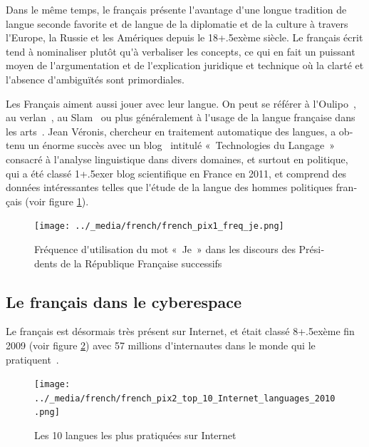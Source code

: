 \begin{french}
\begin{multicols}{2}
Dans le même temps, le français présente l{\mbox '}avantage d{\mbox '}une
longue tradition de langue seconde favorite et de langue de la
diplomatie et de la culture à travers l{\mbox '}Europe, la Russie et
les Amériques depuis le 18\raise+.5ex\hbox{ème} siècle. Le français
écrit tend à nominaliser plutôt qu{\mbox '}à verbaliser les concepts,
ce qui en fait un puissant moyen de l{\mbox '}argumentation et de
l{\mbox '}explication juridique et technique où la clarté et l{\mbox
 '}absence d{\mbox '}ambiguïtés sont primordiales.

Les Français aiment aussi jouer avec leur langue. On peut se référer à
l{\mbox '}Oulipo~\cite{oulipo}, au verlan~\cite{plenat95}, au
Slam~\cite{slam} ou plus généralement à l{\mbox '}usage de la langue
française dans les arts~\cite{arts}. Jean Véronis, chercheur en
traitement automatique des langues, a obtenu un énorme succès avec un
blog~\cite{veronis} intitulé «~Technologies du Langage~» consacré à
l{\mbox '}analyse linguistique dans divers domaines, et surtout en
politique, qui a été classé 1\raise+.5ex\hbox{er} blog scientifique en
France en 2011, et comprend des données intéressantes telles que
l{\mbox '}étude de la langue des hommes politiques français (voir
figure \ref{fig:je_stats}).

\begin{figure}[!ht]
\begin{center}
 \texttt{[image: ../\_media/french/french\_pix1\_freq\_je.png]} 
  \caption{Fréquence d{\mbox '}utilisation du mot «~Je~» dans les discours des Présidents de la République Française successifs}
  \label{fig:je_stats}
\end{center}
\end{figure}

\subsection{Le français dans le cyberespace}

Le français est désormais très présent sur Internet, et était classé
8\raise+.5ex\hbox{ème} fin 2009 (voir figure \ref{fig:internettop10})
avec 57 millions d{\mbox '}internautes dans le monde qui le pratiquent~\cite{internettop10}.

\begin{figure}[!ht]
\begin{center}
 \texttt{[image: ../\_media/french/french\_pix2\_top\_10\_Internet\_languages\_2010.png]}
  \caption{Les 10 langues les plus pratiquées sur Internet~\cite{internettop10}}
  \label{fig:internettop10}
\end{center}
\end{figure}


\end{multicols}
\end{french}
